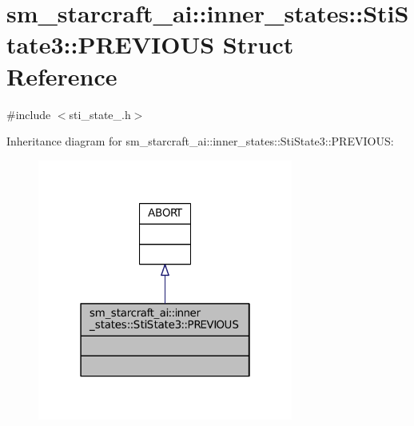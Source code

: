 \hypertarget{structsm__starcraft__ai_1_1inner__states_1_1StiState3_1_1PREVIOUS}{}\section{sm\+\_\+starcraft\+\_\+ai\+:\+:inner\+\_\+states\+:\+:Sti\+State3\+:\+:P\+R\+E\+V\+I\+O\+US Struct Reference}
\label{structsm__starcraft__ai_1_1inner__states_1_1StiState3_1_1PREVIOUS}


{\ttfamily \#include $<$sti\+\_\+state\+\_.\+h$>$}



Inheritance diagram for sm\+\_\+starcraft\+\_\+ai\+:\+:inner\+\_\+states\+:\+:Sti\+State3\+:\+:P\+R\+E\+V\+I\+O\+US\+:
\nopagebreak
\begin{figure}[H]
\begin{center}
\leavevmode
\includegraphics[width=238pt]{structsm__starcraft__ai_1_1inner__states_1_1StiState3_1_1PREVIOUS__inherit__graph}
\end{center}
\end{figure}



